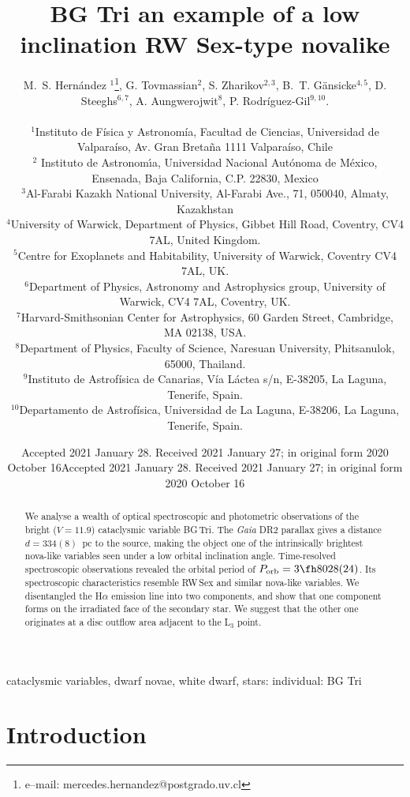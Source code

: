 \documentclass[fleqn,usenatbib]{mnras}
\title[BG Tri: a low inclination RW Sex-type nova-like]{BG Tri an example of a low inclination RW Sex-type novalike}
\author[Hern\'andez, Tovmassian, Zharikov  et al.]{M.~S. Hern\'andez $^{1}$\thanks{e--mail: 
	mercedes.hernandez@postgrado.uv.cl },  G. Tovmassian$^{2}$, S. Zharikov$^{2,3}$, B.~T. G\"ansicke$^{4,5}$, D. Steeghs$^{6,7}$, \newauthor
	A. Aungwerojwit$^{8}$, P. Rodr{\'i}guez-Gil$^{9,10}$.\\ \\
$^{1}$Instituto de F\'{i}sica y Astronom\'{i}a, Facultad de Ciencias, Universidad de Valpara\'{i}so, Av. Gran Breta\~{n}a 1111 Valpara\'{i}so, Chile\\
$^{2}$ Instituto de Astronom\'{\i}a, Universidad Nacional Aut\'onoma de M\'exico, Ensenada, Baja California, C.P. 22830, Mexico\\
$^{3}$Al-Farabi Kazakh National University, Al-Farabi Ave., 71, 050040, Almaty, Kazakhstan\\
$^{4}$University of Warwick, Department of Physics, Gibbet Hill Road, Coventry, CV4 7AL, United Kingdom.\\
$^{5}$Centre for Exoplanets and Habitability, University of Warwick, Coventry CV4 7AL, UK.\\
$^{6}$Department of Physics, Astronomy and Astrophysics group, University of Warwick, CV4 7AL, Coventry, UK.\\
$^{7}$Harvard-Smithsonian Center for Astrophysics, 60 Garden Street, Cambridge, MA 02138, USA.\\
$^{8}$Department of Physics, Faculty of Science, Naresuan University, Phitsanulok, 65000, Thailand.\\
$^{9}$Instituto de Astrof{\'i}sica de Canarias, V{\'i}a  L{\'a}ctea s/n, E-38205, La Laguna, Tenerife, Spain.\\
$^{10}$Departamento de Astrof{\'i}sica, Universidad de La Laguna, E-38206, La Laguna, Tenerife, Spain.\\
}
\date{Accepted 2021 January 28. Received 2021 January 27; in original form 2020 October 16}
\def\bg{BG\,Tri}
\begin{document}
\date{Accepted 2021 January 28. Received 2021 January 27; in original form 2020 October 16}

\pagerange{\pageref{firstpage}--\pageref{lastpage}} 

\maketitle

\label{firstpage}

\begin{abstract}
We analyse a wealth of optical spectroscopic and photometric %
observations 
of the bright ($V=11.9$) cataclysmic variable \bg. 
The {\sl Gaia} DR2 parallax gives a distance $d=334(8)$~pc to the source, 
making the object one of the intrinsically brightest nova-like variables seen under a low orbital inclination angle. 
Time-resolved spectroscopic observations revealed  the orbital period of $P_{\rm{orb}}=3\fh8028(24)$. 
Its spectroscopic characteristics  resemble RW\,Sex and similar nova-like variables. We disentangled 
the H$\alpha$ emission line into two components, and show that one component forms on the irradiated face of the secondary star. We suggest that the other one originates at a disc outflow area adjacent to the L$_3$ point. 
\end{abstract}

\begin{keywords}
cataclysmic variables, dwarf novae, white dwarf, stars: individual:  BG Tri
\end{keywords}


 
\section{Introduction}
\label{intro}
\end{document}
